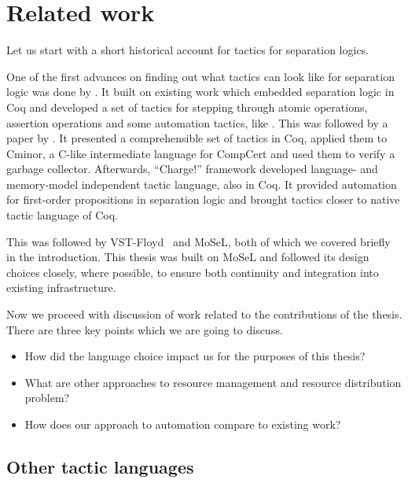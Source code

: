 \chapter{Related work}
\label{cha:related-work}

Let us start with a short historical account for tactics for separation logics.

One of the first advances on finding out what tactics can look like for separation logic was done by \citet{appel2006tactics}.
It built on existing work which embedded separation logic in Coq and developed a set of tactics for stepping through atomic operations, assertion operations and some automation tactics, like .
This was followed by a paper by \citet{mccreightPracticalTacticsSeparation2009}.
It presented a comprehensible set of tactics in Coq, applied them to Cminor, a C-like intermediate language for CompCert and used them to verify a garbage collector.
Afterwards, ``Charge!'' framework \cite{bengtsonCharge2012} developed language- and memory-model independent tactic language, also in Coq.
It provided automation for first-order propositions in separation logic and brought tactics closer to native tactic language of Coq.

This was followed by VST-Floyd~\cite{caoVSTFloydSeparationLogic2018} and MoSeL\cite{krebbersInteractiveProofsHigherorder2017, krebbersMoSeLGeneralExtensible2018}, both of which we covered briefly in the introduction.
This thesis was built on MoSeL and followed its design choices closely, where possible, to ensure both continuity and integration into existing infrastructure.

Now we proceed with discussion of work related to the contributions of the thesis.
There are three key points which we are going to discuss.
\begin{itemize}
\item How did the language choice impact us for the purposes of this thesis?
\item What are other approaches to resource management and resource distribution problem?
\item How does our approach to automation compare to existing work?
\end{itemize}

\section{Other tactic languages}
\label{sec:other-tact-lang}


